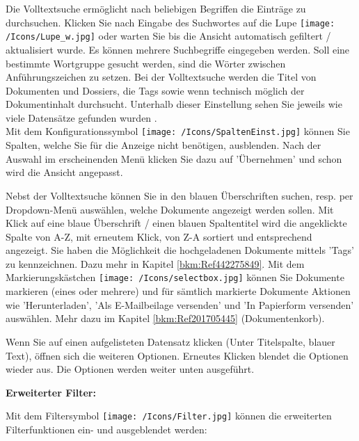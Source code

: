 Die Volltextsuche  ermöglicht nach beliebigen Begriffen die Einträge zu durchsuchen. Klicken Sie nach Eingabe des Suchwortes auf die Lupe \texttt{[image: /Icons/Lupe\_w.jpg]}  oder warten Sie bis die Ansicht automatisch gefiltert / aktualisiert wurde. Es können mehrere Suchbegriffe eingegeben werden. Soll eine bestimmte Wortgruppe gesucht werden, sind die Wörter zwischen Anführungszeichen zu setzen. Bei der Volltextsuche werden die Titel von Dokumenten und Dossiers, die Tags sowie wenn technisch möglich der Dokumentinhalt durchsucht. Unterhalb dieser Einstellung sehen Sie jeweils wie viele Datensätze gefunden wurden .\\
Mit dem Konfigurationssymbol \texttt{[image: /Icons/SpaltenEinst.jpg]}  können Sie Spalten, welche Sie für die Anzeige nicht benötigen, ausblenden. Nach der Auswahl im erscheinenden Menü klicken Sie dazu auf 'Übernehmen' und schon wird die Ansicht angepasst. \newline

Nebst der Volltextsuche können Sie in den blauen Überschriften  suchen, resp. per Dropdown-Menü auswählen, welche Dokumente angezeigt werden sollen. Mit Klick auf eine blaue Überschrift / einen blauen Spaltentitel wird die angeklickte Spalte von A-Z, mit erneutem Klick, von Z-A sortiert und entsprechend angezeigt. Sie haben die Möglichkeit die hochgeladenen Dokumente mittels 'Tags' zu kennzeichnen. Dazu mehr in Kapitel \ref{bkm:Ref442275849}. \newline
Mit dem Markierungskästchen \texttt{[image: /Icons/selectbox.jpg]}  können Sie Dokumente markieren (eines oder mehrere) und für sämtlich markierte Dokumente Aktionen wie 'Herunterladen', 'Als E-Mailbeilage versenden' und 'In Papierform versenden' auswählen. Mehr dazu im Kapitel \ref{bkm:Ref201705445} (Dokumentenkorb).

Wenn Sie auf einen aufgelisteten Datensatz klicken  (Unter Titelspalte, blauer Text), öffnen sich die weiteren Optionen. Erneutes Klicken blendet die Optionen wieder aus. Die Optionen werden weiter unten ausgeführt.

\vspace{\baselineskip}

\textbf{Erweiterter Filter:}\\
\label{bkm:Ref201704051}

Mit dem Filtersymbol \texttt{[image: /Icons/Filter.jpg]}  können die erweiterten Filterfunktionen ein- und ausgeblendet werden:

